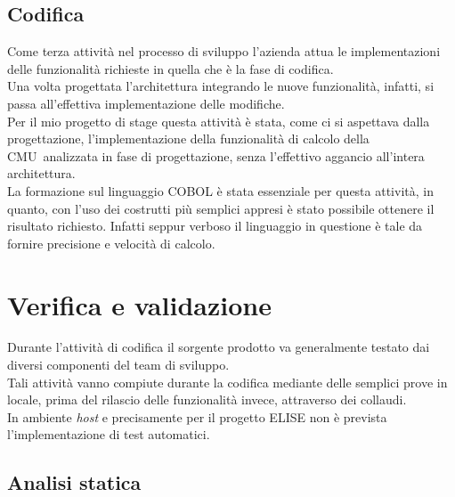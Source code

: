 \subsection{Codifica}
	
	Come terza attività nel processo di sviluppo l'azienda attua le implementazioni delle funzionalità richieste in quella che è la fase di codifica.\\	
		
	Una volta progettata l'architettura integrando le nuove funzionalità, infatti, si passa all'effettiva implementazione delle modifiche.\\

	Per il mio progetto di stage questa attività è stata, come ci si aspettava dalla progettazione, l'implementazione della funzionalità di calcolo della CMU\glossario\ analizzata in fase di progettazione, senza l'effettivo aggancio all'intera architettura.\\
	
	La formazione sul linguaggio COBOL è stata essenziale per questa attività, in quanto, con l'uso dei costrutti più semplici appresi è stato possibile ottenere il risultato richiesto. Infatti seppur verboso il linguaggio in questione è tale da fornire precisione e velocità di calcolo.
	
\section{Verifica e validazione}

Durante l'attività di codifica il sorgente prodotto va generalmente testato dai diversi componenti del team di sviluppo.\\

Tali attività vanno compiute durante la codifica mediante delle semplici prove in locale, prima del rilascio delle funzionalità invece, attraverso dei collaudi.\\

In ambiente \textit{host} e precisamente per il progetto ELISE non è prevista l'implementazione di test automatici.\\

\subsection{Analisi statica}

